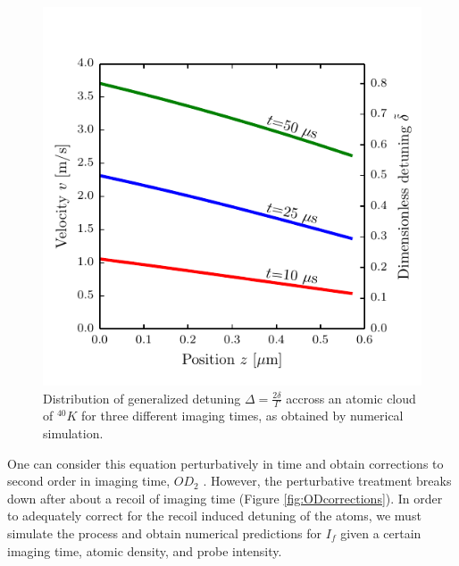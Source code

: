 \documentclass[12pt]{iopart}
\begin{document}
\begin{figure}
	\includegraphics*[scale=0.57]{figure1}
\caption{Distribution of generalized detuning $\Delta=\frac{2\delta}{\Gamma}$ accross an atomic cloud of $^{40}K$ for three different imaging times, as obtained by numerical simulation.}  
\label{fig:detunedBlobs}
\end{figure}
\par One can consider this equation perturbatively in time and obtain corrections to second order in imaging time, $OD_2$  \cite{LJLthesis}. However, the perturbative treatment breaks down after about a recoil of imaging time (Figure \ref{fig:ODcorrections}). In order to adequately correct for the recoil induced detuning of the atoms, we must simulate the process and obtain numerical predictions for $I_f$ given a certain imaging time, atomic density, and probe intensity. 
\end{document}
